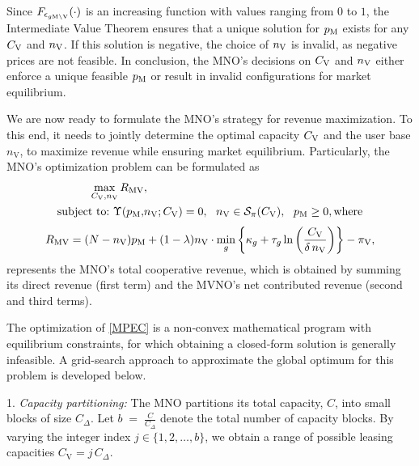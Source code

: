 \documentclass[12pt, draftclsnofoot, onecolumn]{IEEEtran}
\begin{document}
		
		Since \(F_{\epsilon_{g{\rm M}\setminus {\rm V}}}(\cdot)\) is an increasing function with values ranging from $0$ to $1$, the Intermediate Value Theorem ensures that a unique solution for \(p_{\rm M}\) exists for any \(C_{\rm V}\) and \(n_{\rm V}\). If this solution is negative, the choice of \(n_{\rm V}\) is invalid, as negative prices are not feasible. In conclusion, the MNO's decisions on \(C_{\rm V}\) and \(n_{\rm V}\) either enforce a unique feasible \(p_{\rm M}\) or result in invalid configurations for market equilibrium.
		
		
		We are now ready to formulate the MNO's strategy for revenue maximization. To this end, it needs to jointly determine the optimal capacity $C_{\rm V}$ and the user base \( n_{\mathrm{V}} \), to maximize revenue while ensuring market equilibrium.
		Particularly, the MNO's optimization problem can be formulated as
		\vspace{-.5cm}
		\begin{subequations}\label{optimization_problem}
			\renewcommand{\theequation}{\theparentequation-\alph{equation}}
			\begin{align}
				\max_{C_{\rm V},n_{\rm V}} R_{\rm MV}&, \label{optimization_problem-a}\\
				\text{subject to:} \ \Upsilon(p_{\rm M}, &n_{\rm V}; C_{\rm V})=0,\ \ n_{\rm V}\in \mathcal{S}_{\pi}(C_{\rm V}),\ \ p_{\rm M}\geq 0, \text{where}  \label{optimization_problem-b}
			\end{align}\label{MPEC}
		\end{subequations}
		\vspace{-1cm}
		\begin{align}
			R_{\rm MV}=(N-n_{\rm V}) p_{\rm M}+ (1-\lambda)n_{\rm V}\cdot \min_{g} \left\{ \kappa_g+ \tau_g \ln \left( \frac{C_{\rm V}}{\delta \, n_{\rm V}} \right) \right\} - \pi_{\rm V},
		\end{align}
		represents the MNO’s total cooperative revenue, which is obtained by summing its direct revenue (first term) and the MVNO’s net contributed revenue (second and third terms). 
		
		
		The optimization of \eqref{MPEC} is a non‐convex mathematical program with equilibrium constraints, for which obtaining a closed‐form solution is generally infeasible. A grid-search approach to approximate the global optimum for this problem is developed below.
		
		1. \textit{Capacity partitioning:} The MNO partitions its total capacity, \(C\), into small blocks of size \(C_{\Delta}\). Let
		$b \;=\;\frac{C}{C_{\Delta}}
		$
		denote the total number of capacity blocks. By varying the integer index \(j \in \{1,2,\dots,b\}\), we obtain a range of possible leasing capacities \(C_{\mathrm{V}} = j \, C_{\Delta}\). 
		
\end{document}

